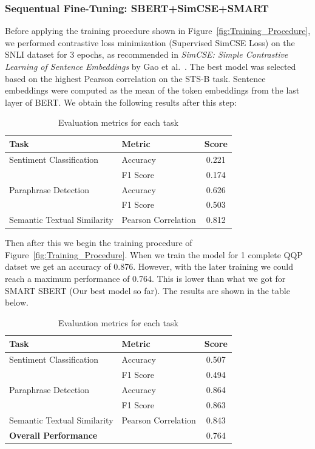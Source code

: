 \subsubsection{Sequentual Fine-Tuning: SBERT+SimCSE+SMART}
Before applying the training procedure shown in Figure~\ref{fig:Training_Procedure}, we performed contrastive loss minimization (Supervised SimCSE Loss) on the SNLI dataset for 3 epochs, as recommended in \textit{SimCSE: Simple Contrastive Learning of Sentence Embeddings} by Gao et al.~\cite{gao2021simcse}. The best model was selected based on the highest Pearson correlation on the STS-B task. Sentence embeddings were computed as the mean of the token embeddings from the last layer of BERT.
We obtain the following results after this step:
\begin{table}[H]
\centering
\begin{tabular}{|l|l|c|}
\hline
\textbf{Task} & \textbf{Metric} & \textbf{Score} \\
\hline
Sentiment Classification & Accuracy & 0.221 \\
& F1 Score & 0.174 \\
\hline
Paraphrase Detection & Accuracy & 0.626 \\
& F1 Score & 0.503 \\
\hline
Semantic Textual Similarity & Pearson Correlation & 0.812 \\
\hline
\end{tabular}
\caption{Evaluation metrics for each task}
\end{table}

Then after this we begin the training procedure of Figure~\ref{fig:Training_Procedure}. When we train the model for 1 complete QQP datset we get an accuracy of 0.876. However, with the later training we could reach a maximum performance of 0.764. This is lower than what we got for SMART SBERT (Our best model so far).
The results are shown in the table below.

\begin{table}[H]
\centering
\begin{tabular}{|l|l|c|}
\hline
\textbf{Task} & \textbf{Metric} & \textbf{Score} \\
\hline
Sentiment Classification & Accuracy & 0.507 \\
& F1 Score & 0.494 \\
\hline
Paraphrase Detection & Accuracy & 0.864 \\
& F1 Score & 0.863 \\
\hline
Semantic Textual Similarity & Pearson Correlation & 0.843 \\
\hline
\multicolumn{2}{|l|}{\textbf{Overall Performance}} & 0.764 \\
\hline
\end{tabular}
\caption{Evaluation metrics for each task}
\end{table}


